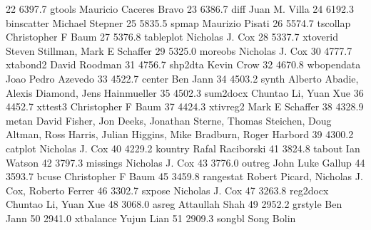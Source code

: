     22   6397.7    gtools        Mauricio Caceres Bravo                  
    23   6386.7    diff          Juan M. Villa                           
    24   6192.3    binscatter    Michael Stepner                         
    25   5835.5    spmap         Maurizio Pisati                         
    26   5574.7    tscollap      Christopher F Baum                      
    27   5376.8    tableplot     Nicholas J. Cox                         
    28   5337.7    xtoverid      Steven Stillman, Mark E Schaffer        
    29   5325.0    moreobs       Nicholas J. Cox                         
    30   4777.7    xtabond2      David Roodman                           
    31   4756.7    shp2dta       Kevin Crow                              
    32   4670.8    wbopendata    Joao Pedro Azevedo                      
    33   4522.7    center        Ben Jann                                
    34   4503.2    synth         Alberto Abadie, Alexis Diamond, Jens    
                                   Hainmueller                             
    35   4502.3    sum2docx      Chuntao Li, Yuan Xue                    
    36   4452.7    xttest3       Christopher F Baum                      
    37   4424.3    xtivreg2      Mark E Schaffer                         
    38   4328.9    metan         David Fisher, Jon Deeks, Jonathan       
                                   Sterne, Thomas Steichen, Doug Altman,   
                                   Ross Harris, Julian Higgins, Mike       
                                   Bradburn, Roger Harbord                 
    39   4300.2    catplot       Nicholas J. Cox                         
    40   4229.2    kountry       Rafal Raciborski                        
    41   3824.8    tabout        Ian Watson                              
    42   3797.3    missings      Nicholas J. Cox                         
    43   3776.0    outreg        John Luke Gallup                        
    44   3593.7    bcuse         Christopher F Baum                      
    45   3459.8    rangestat     Robert Picard, Nicholas J. Cox, Roberto 
                                   Ferrer                                  
    46   3302.7    sxpose        Nicholas J. Cox                         
    47   3263.8    reg2docx      Chuntao Li, Yuan Xue                    
    48   3068.0    asreg         Attaullah Shah                          
    49   2952.2    grstyle       Ben Jann                                
    50   2941.0    xtbalance     Yujun Lian                              
    51   2909.3    songbl        Song Bolin                              
